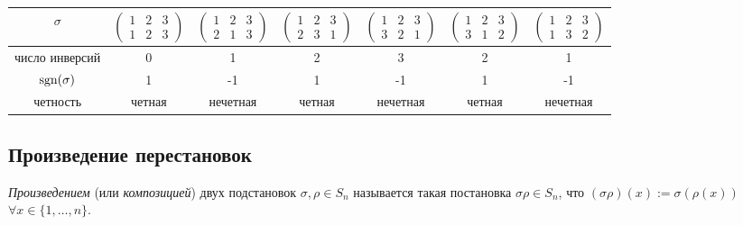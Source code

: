 \begin{table}[!ht]
    \begin{tabular}{c|c|c|c|c|c|c}
        $\sigma$ & $\begin{pmatrix} 1 & 2 & 3 \\ 1 & 2 & 3 \end{pmatrix}$ & $\begin{pmatrix} 1 & 2 & 3 \\ 2 & 1 & 3 \end{pmatrix}$ & $\begin{pmatrix} 1 & 2 & 3 \\ 2 & 3 & 1 \end{pmatrix}$ & $\begin{pmatrix} 1 & 2 & 3 \\ 3 & 2 & 1 \end{pmatrix}$ & $\begin{pmatrix} 1 & 2 & 3 \\ 3 & 1 & 2 \end{pmatrix}$ & $\begin{pmatrix} 1 & 2 & 3 \\ 1 & 3 & 2 \end{pmatrix}$ \\
        \hline
        число инверсий & 0 & 1 & 2 & 3 & 2 & 1\\
        \hline
        $\operatorname{\mathop{\mathrm{sgn}}}(\sigma)$ & 1 & -1 & 1 & -1 & 1 & -1 \\
        \hline
        четность & четная & нечетная & четная & нечетная & четная & нечетная
    \end{tabular}
\end{table}

\begin{comment}
    число инверсий в $\sigma \in S_n \leq \binom{n}{2} = \frac{n(n-1)}{2}$, равенство достигается при
    $\sigma = \begin{pmatrix}
        1 & 2 & \dots & n \\
        n & n-1 & \dots & 1
    \end{pmatrix}$
\end{comment}


\subsection{Произведение перестановок}
\begin{definition}
    \textit{Произведением} (или \textit{композицией}) двух подстановок $\sigma, \rho \in S_n$ называется такая постановка $\sigma \rho \in S_n$, что $(\sigma \rho)(x) := \sigma (\rho (x))$ $\forall x \in \{1, \dots, n\}$.
\end{definition}

